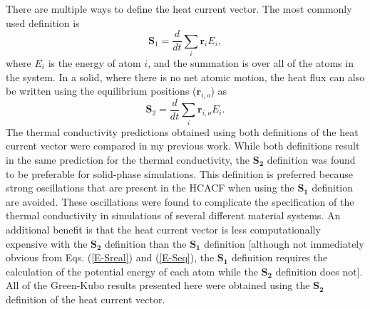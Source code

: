 \documentclass[letterpaper,12pt]{article}
\newcommand{\f}[2]{\ensuremath{\frac{\displaystyle{#1}}{\displaystyle{#2}}}}
\begin{document}
There are multiple ways to define the heat current
vector.\cite{mcgaughey2006book,ladd1986,julithesis} The most
commonly used definition is
\begin{equation}
\mathbf{S}_1 = \f{d}{dt} \sum_i \mathbf{r}_i E_i, \label{E-Sreal}
\end{equation}
where $E_i$ is the energy of atom $i$, and the summation is over all
of the atoms in the system. In a solid, where there is no net atomic
motion, the heat flux can also be written using the equilibrium
positions ($\mathbf{r}_{i,o}$) as
\begin{equation}
\mathbf{S}_2 = \f{d}{dt} \sum_i \mathbf{r}_{i,o} E_i. \label{E-Seq}
\end{equation}
The thermal conductivity predictions obtained using both definitions
of the heat current vector were compared in my previous
work.\cite{landry2008a} While both definitions result in the same
prediction for the thermal conductivity, the $\mathbf{S_2}$
definition was found to be preferable for solid-phase simulations.
This definition is preferred because strong oscillations that are
present in the HCACF when using the $\mathbf{S_1}$ definition are
avoided. These oscillations were found to complicate the
specification of the thermal conductivity in simulations of several
different material
systems.\cite{che2000,landry2008a,mcgaughey2006,mcgaughey2004b} An
additional benefit is that the heat current vector is less
computationally expensive with the $\mathbf{S_2}$ definition than
the $\mathbf{S_1}$ definition [although not immediately obvious from
Eqs. (\ref{E-Sreal}) and (\ref{E-Seq}), the $\mathbf{S_1}$
definition requires the calculation of the potential energy of each
atom while the $\mathbf{S_2}$ definition does
not\cite{landry2008a}]. All of the Green-Kubo results presented here
were obtained using the $\mathbf{S_2}$ definition of the heat
current vector.
\end{document}
